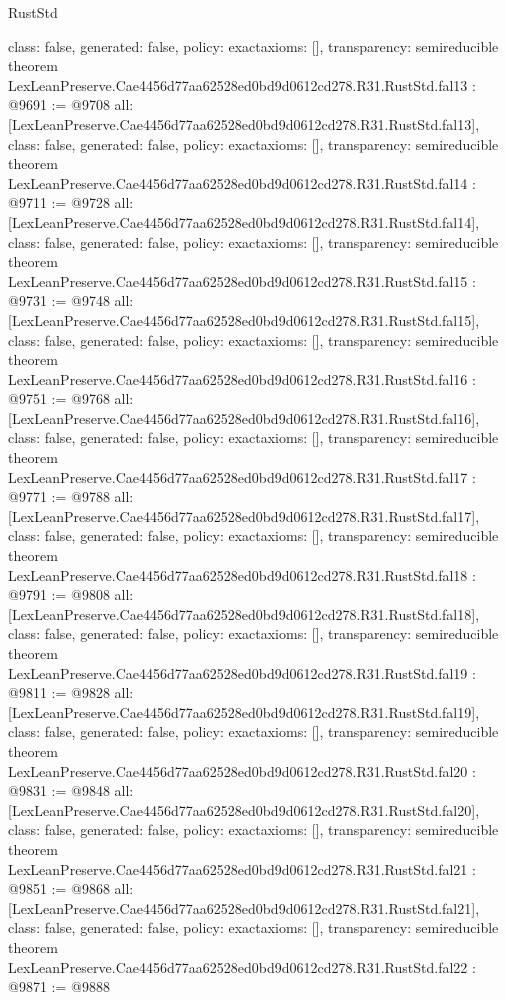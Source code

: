 \begin{lexlean}{RustStd}
\begin{coremodule}
{  class: false,
  generated: false,
  policy: exact{axioms: []},
  transparency: semireducible
}
theorem LexLeanPreserve.Cae4456d77aa62528ed0bd9d0612cd278.R31.RustStd.fal13 : @9691 := @9708 {
  all: [LexLeanPreserve.Cae4456d77aa62528ed0bd9d0612cd278.R31.RustStd.fal13],
  class: false,
  generated: false,
  policy: exact{axioms: []},
  transparency: semireducible
}
theorem LexLeanPreserve.Cae4456d77aa62528ed0bd9d0612cd278.R31.RustStd.fal14 : @9711 := @9728 {
  all: [LexLeanPreserve.Cae4456d77aa62528ed0bd9d0612cd278.R31.RustStd.fal14],
  class: false,
  generated: false,
  policy: exact{axioms: []},
  transparency: semireducible
}
theorem LexLeanPreserve.Cae4456d77aa62528ed0bd9d0612cd278.R31.RustStd.fal15 : @9731 := @9748 {
  all: [LexLeanPreserve.Cae4456d77aa62528ed0bd9d0612cd278.R31.RustStd.fal15],
  class: false,
  generated: false,
  policy: exact{axioms: []},
  transparency: semireducible
}
theorem LexLeanPreserve.Cae4456d77aa62528ed0bd9d0612cd278.R31.RustStd.fal16 : @9751 := @9768 {
  all: [LexLeanPreserve.Cae4456d77aa62528ed0bd9d0612cd278.R31.RustStd.fal16],
  class: false,
  generated: false,
  policy: exact{axioms: []},
  transparency: semireducible
}
theorem LexLeanPreserve.Cae4456d77aa62528ed0bd9d0612cd278.R31.RustStd.fal17 : @9771 := @9788 {
  all: [LexLeanPreserve.Cae4456d77aa62528ed0bd9d0612cd278.R31.RustStd.fal17],
  class: false,
  generated: false,
  policy: exact{axioms: []},
  transparency: semireducible
}
theorem LexLeanPreserve.Cae4456d77aa62528ed0bd9d0612cd278.R31.RustStd.fal18 : @9791 := @9808 {
  all: [LexLeanPreserve.Cae4456d77aa62528ed0bd9d0612cd278.R31.RustStd.fal18],
  class: false,
  generated: false,
  policy: exact{axioms: []},
  transparency: semireducible
}
theorem LexLeanPreserve.Cae4456d77aa62528ed0bd9d0612cd278.R31.RustStd.fal19 : @9811 := @9828 {
  all: [LexLeanPreserve.Cae4456d77aa62528ed0bd9d0612cd278.R31.RustStd.fal19],
  class: false,
  generated: false,
  policy: exact{axioms: []},
  transparency: semireducible
}
theorem LexLeanPreserve.Cae4456d77aa62528ed0bd9d0612cd278.R31.RustStd.fal20 : @9831 := @9848 {
  all: [LexLeanPreserve.Cae4456d77aa62528ed0bd9d0612cd278.R31.RustStd.fal20],
  class: false,
  generated: false,
  policy: exact{axioms: []},
  transparency: semireducible
}
theorem LexLeanPreserve.Cae4456d77aa62528ed0bd9d0612cd278.R31.RustStd.fal21 : @9851 := @9868 {
  all: [LexLeanPreserve.Cae4456d77aa62528ed0bd9d0612cd278.R31.RustStd.fal21],
  class: false,
  generated: false,
  policy: exact{axioms: []},
  transparency: semireducible
}
theorem LexLeanPreserve.Cae4456d77aa62528ed0bd9d0612cd278.R31.RustStd.fal22 : @9871 := @9888 {
}
\end{coremodule}
\end{lexlean}
